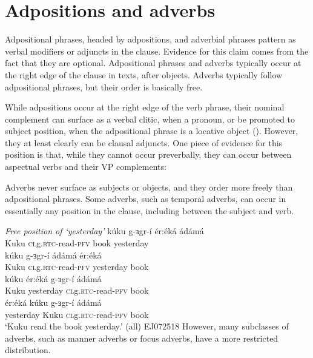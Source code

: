 \chapter{Adpositions and adverbs}\label{chapter:adverbs}

Adpositional phrases, headed by adpositions, and adverbial phrases pattern as verbal modifiers or adjuncts in the clause. Evidence for this claim comes from the fact that they are optional. Adpositional phrases and adverbs typically occur at the right edge of the clause in texts, after objects. Adverbs typically follow adpositional phrases, but their order is basically free.



While adpositions occur at the right edge of the verb phrase, their nominal complement can surface as a verbal clitic, when a pronoun, or be promoted to subject position, when the adpositional phrase is a locative object (). However, they at least clearly can be clausal adjuncts. One piece of evidence for this position is that, while they cannot occur preverbally, they can occur between aspectual verbs and their VP complements:




Adverbs never surface as subjects or objects, and they order more freely than adpositional phrases. Some adverbs, such as temporal adverbs, can occur in essentially any position in the clause, including between the subject and verb.

\ea \textit{Free position of `yesterday'} \label{ex:ch13:yesterday}
\ea \gll kúku g-ɜgr-í ér:éká ádámá\\
Kuku \textsc{cl}g.\textsc{rtc}-read-\textsc{pfv} book yesterday\\
\ex \gll kúku g-ɜgr-í ádámá ér:éká\\
Kuku \textsc{cl}g.\textsc{rtc}-read-\textsc{pfv} yesterday book\\
\ex \gll kúku ér:éká g-ɜgr-í ádámá\\
Kuku yesterday \textsc{cl}g.\textsc{rtc}-read-\textsc{pfv} book\\
\ex \gll ér:éká kúku g-ɜgr-í ádámá\\
yesterday Kuku \textsc{cl}g.\textsc{rtc}-read-\textsc{pfv} book\\
\glt `Kuku read the book yesterday.' (all) \hfill EJ072518
\z
\z
However, many subclasses of adverbs, such as manner adverbs or focus adverbs, have a more restricted distribution.



